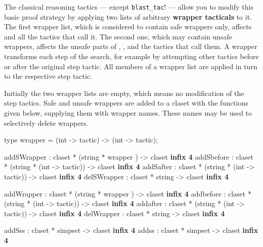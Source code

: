 The classical reasoning tactics --- except \texttt{blast_tac}! --- allow
you to modify this basic proof strategy by applying two lists of arbitrary 
{\bf wrapper tacticals} to it. 
The first wrapper list, which is considered to contain safe wrappers only, 
affects  and all the tactics that call it.  
The second one, which may contain unsafe wrappers, affects the unsafe parts
of , , and the tactics that call them.
A wrapper transforms each step of the search, for example 
by attempting other tactics before or after the original step tactic. 
All members of a wrapper list are applied in turn to the respective step tactic.

Initially the two wrapper lists are empty, which means no modification of the
step tactics. Safe and unsafe wrappers are added to a claset 
with the functions given below, supplying them with wrapper names. 
These names may be used to selectively delete wrappers.

\begin{ttbox} 
type wrapper = (int -> tactic) -> (int -> tactic);

addSWrapper  : claset * (string *  wrapper       ) -> claset \hfill{\bf infix 4}
addSbefore   : claset * (string * (int -> tactic)) -> claset \hfill{\bf infix 4}
addSafter    : claset * (string * (int -> tactic)) -> claset \hfill{\bf infix 4}
delSWrapper  : claset *  string                    -> claset \hfill{\bf infix 4}

addWrapper   : claset * (string *  wrapper       ) -> claset \hfill{\bf infix 4}
addbefore    : claset * (string * (int -> tactic)) -> claset \hfill{\bf infix 4}
addafter     : claset * (string * (int -> tactic)) -> claset \hfill{\bf infix 4}
delWrapper   : claset *  string                    -> claset \hfill{\bf infix 4}

addSss       : claset * simpset -> claset                 \hfill{\bf infix 4}
addss        : claset * simpset -> claset                 \hfill{\bf infix 4}
\end{ttbox}
%

